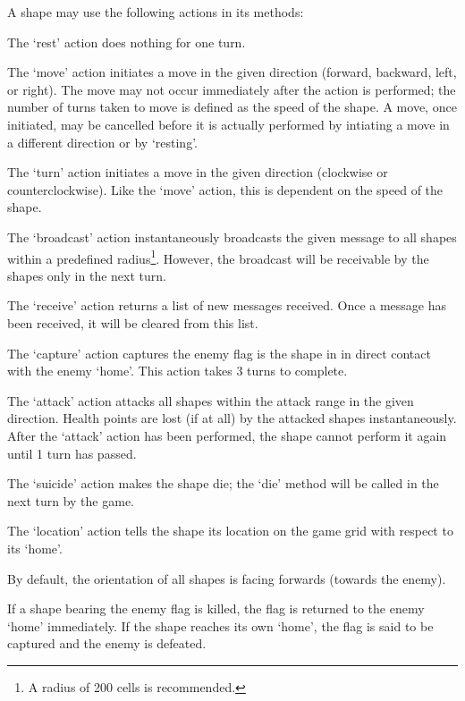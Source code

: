 \documentclass[a4paper,11pt]{article}
\begin{document}
A shape may use the following actions in its methods:
\begin{description}
\addtolength{\itemsep}{-4pt}
    \item[rest] The `rest' action does nothing for one turn.
    \item[move(direction)] The `move' action initiates a move in the given direction (forward, backward, left, or right). The move may not occur immediately after the action is performed; the number of turns taken to move is defined as the \textsf{speed} of the shape. A move, once initiated, may be cancelled before it is actually performed by intiating a move in a different direction or by `resting'.
    \item[turn(direction)] The `turn' action initiates a move in the given direction (clockwise or counterclockwise). Like the `move' action, this is dependent on the \textsf{speed} of the shape.
    \item[broadcast(message)] The `broadcast' action instantaneously broadcasts the given message to all shapes within a predefined radius\footnote{A radius of 200 cells is recommended.}. However, the broadcast will be receivable by the shapes only in the next turn.
    \item[receive] The `receive' action returns a list of new messages received. Once a message has been received, it will be cleared from this list.
    \item[capture] The `capture' action captures the enemy flag is the shape in in direct contact with the enemy `home'. This action takes 3 turns to complete.
    \item[attack(direction)] The `attack' action attacks all shapes within the \textsf{attack range} in the given direction. Health points are lost (if at all) by the attacked shapes instantaneously. After the `attack' action has been performed, the shape cannot perform it again until 1 turn has passed.
    \item[suicide] The `suicide' action makes the shape die; the `die' method will be called in the next turn by the game.
    \item[location] The `location' action tells the shape its location on the game grid with respect to its `home'.
\end{description}

By default, the orientation of all shapes is facing forwards (towards the enemy).

If a shape bearing the enemy flag is killed, the flag is returned to the enemy `home' immediately. If the shape reaches its own `home', the flag is said to be captured and the enemy is defeated.
\end{document}
